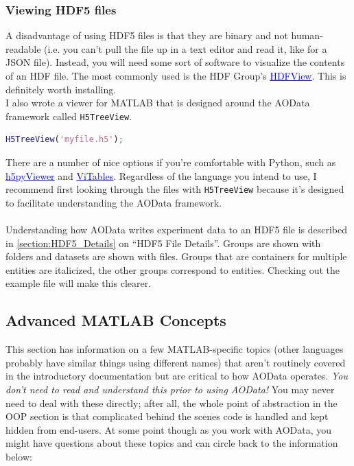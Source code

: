\documentclass[10pt]{exam}
\newcommand\myurl[1]{\textcolor{blue}{\underline{#1}}}
\newcommand\aodclass[1]{\textcolor{codeblue}{\texttt{#1}}}
\begin{document}
		\subsubsection{Viewing HDF5 files}
			\noindent A disadvantage of using HDF5 files is that they are binary and not human-readable (i.e. you can't pull the file up in a text editor and read it, like for a JSON file). Instead, you will need some sort of software to visualize the contents of an HDF file. The most commonly used is the HDF Group's \href{https://www.hdfgroup.org/downloads/hdfview/}{\myurl{HDFView}}. This is definitely worth installing. 
			\\I also wrote a viewer for MATLAB that is designed around the AOData framework called \aodclass{H5TreeView}. 
			\begin{lstlisting}[language=matlab]
	H5TreeView('myfile.h5');
			\end{lstlisting}
			There are a number of nice options if you're comfortable with Python, such as \href{https://github.com/ganymede42/h5pyViewer}{\myurl{h5pyViewer}} and \href{https://vitables.org}{\myurl{ViTables}}. Regardless of the language you intend to use, I recommend first looking through the files with \aodclass{H5TreeView} because it's designed to facilitate understanding the AOData framework.
			\\$\quad$\\
			\noindent Understanding how AOData writes experiment data to an HDF5 file is described in \myurl{\ref{section:HDF5_Details}} on ``HDF5 File Details''. Groups are shown with folders and datasets are shown with files. Groups that are containers for multiple entities are italicized, the other groups correspond to entities. Checking out the example file will make this clearer.
	\subsection{Advanced MATLAB Concepts}
		\noindent This section has information on a few MATLAB-specific topics (other languages probably have similar things using different names) that aren't routinely covered in the introductory documentation but are critical to how AOData operates. \textit{You don't need to read and understand this prior to using AOData!} You may never need to deal with these directly; after all, the whole point of abstraction in the OOP section is that complicated behind the scenes code is handled and kept hidden from end-users. At some point though as you work with AOData, you might have questions about these topics and can circle back to the information below:
\end{document}
